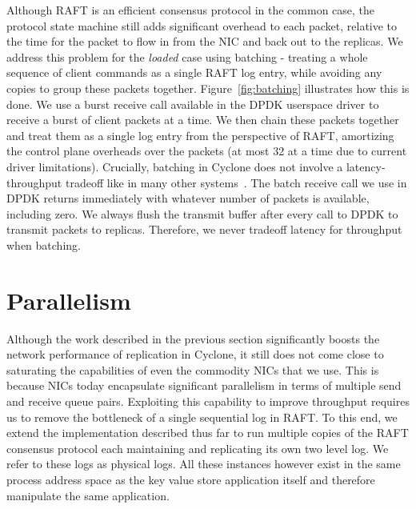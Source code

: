 \documentclass[pageno]{jpaper}
\begin{document}
Although RAFT is an efficient consensus protocol in the common case, the
protocol state machine still adds significant overhead to each packet, relative
to the time for the packet to flow in from the NIC and back out to the replicas.
We address this problem for the \emph{loaded} case using batching - treating a
whole sequence of client commands as a single RAFT log entry, while avoiding any
copies to group these packets together. Figure~\ref{fig:batching} illustrates
how this is done. We use a burst receive call available in the DPDK userspace
driver to receive a burst of client packets at a time. We then chain these
packets together and treat them as a single log entry from the perspective of
RAFT, amortizing the control plane overheads over the packets (at most 32 at a
time due to current driver limitations). Crucially, batching in Cyclone does not
involve a latency-throughput tradeoff like in many other
systems~\cite{ix-dataplane}. The batch receive call we use in DPDK returns
immediately with whatever number of packets is available, including zero. We
always flush the transmit buffer after every call to DPDK to transmit packets to
replicas. Therefore, we never tradeoff latency for throughput when batching. 



\section{Parallelism}
\label{sec:parallelism}


Although the work described in the previous section significantly boosts the
network performance of replication in Cyclone, it still does not come close to
saturating the capabilities of even the commodity NICs that we use. This is
because NICs today encapsulate significant parallelism in terms of
multiple send and receive queue pairs. Exploiting this capability to improve
throughput requires us to remove the bottleneck of a single sequential log in
RAFT. To this end, we extend the implementation described thus far to run
multiple copies of the RAFT consensus protocol each maintaining and replicating
its own two level log. We refer to these logs as physical logs. All these
instances however exist in the same process address space as the key value store
application itself and therefore manipulate the same application.
\end{document}
